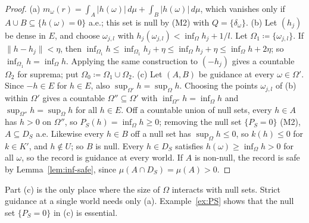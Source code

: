 \documentclass[11pt]{article}
\theoremstyle{plain}
\theoremstyle{definition}
\theoremstyle{remark}
\begin{document}
\begin{proof}
(a) $m_\omega(r)=\int_A|h(\omega)|\,d\mu+\int_B|h(\omega)|\,d\mu$, which vanishes only if
$A\cup B\subseteq\{h(\omega)=0\}$ a.e.; this set is null by (M2) with $Q=\{\delta_\omega
\}$.
(b) Let $(h_j)$ be dense in $E$, and choose $\omega_{j,l}$ with $h_j(\omega_{j,l})<\inf_\Omega
h_j+1/l$. Let $\Omega_1\coloneqq\{\omega_{j,l}\}$. If $\|h-h_j\|<\eta$, then $\inf_{\Omega_1}
h\le\inf_{\Omega_1}h_j+\eta\le\inf_\Omega h_j+\eta\le\inf_\Omega h+2\eta$; so
$\inf_{\Omega_1}h=\inf_\Omega h$. Applying the same construction to $(-h_j)$ gives a
countable $\Omega_2$ for suprema; put $\Omega_0\coloneqq\Omega_1\cup\Omega_2$.
(c) Let $(A,B)$ be guidance at every $\omega\in\Omega'$. Since $-h\in E$ for $h\in E$,
also $\sup_{\Omega'}h=\sup_\Omega h$. Choosing the points $\omega_{j,l}$ of (b) within
$\Omega'$ gives a countable $\Omega''\subseteq\Omega'$ with $\inf_{\Omega''}h=\inf_\Omega h$
and $\sup_{\Omega''}h=\sup_\Omega h$ for all $h\in E$. Off a countable union of
null sets, every $h\in A$ has $h>0$ on $\Omega''$, so $P_S(h)=\inf_\Omega h\ge0$; removing
the null set $\{P_S=0\}$ (M2), $A\subseteq D_S$ a.e. Likewise every $h\in B$ off a null set
has $\sup_\Omega h\le0$, so $k(h)\le0$ for $k\in K'$, and $h\notin U$; so $B$ is null.
Every $h\in D_S$ satisfies $h(\omega)\ge\inf_\Omega h>0$ for all $\omega$, so the record is
guidance at every world. If $A$ is non-null, the record is safe by
Lemma~\ref{lem:inf-safe}, since $\mu(A\cap D_S)=\mu(A)>0$.
\end{proof}

Part (c) is the only place where the size of $\Omega$ interacts with null sets. Strict
guidance at a single world needs only (a). Example~\ref{ex:PS} shows that the null set
$\{P_S=0\}$ in (c) is essential.
\end{document}
